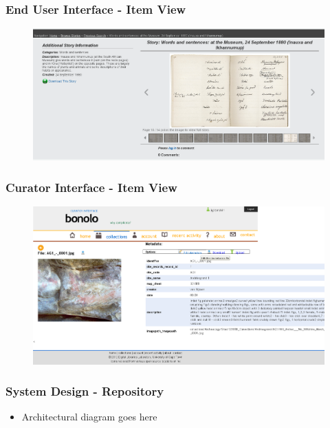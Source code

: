 \documentclass[xcolor=pdftex,t,11pt]{beamer}
\begin{document}
\begin{frame}[fragile]
\frametitle{End User Interface - Item View}
\begin{figure}
\includegraphics{images/icadl2012_bonolo_end_user_interface.png}
\end{figure}
\end{frame}

\begin{frame}[fragile]
\frametitle{Curator Interface - Item View}
\begin{figure}
\includegraphics{images/bonolo-ci-item.png}
\end{figure}
\end{frame}

\begin{frame}[fragile]
\frametitle{System Design - Repository}
\begin{itemize}
\item Architectural diagram goes here
\end{itemize}
\begin{figure}
\end{figure}
\end{frame}
\end{document}
